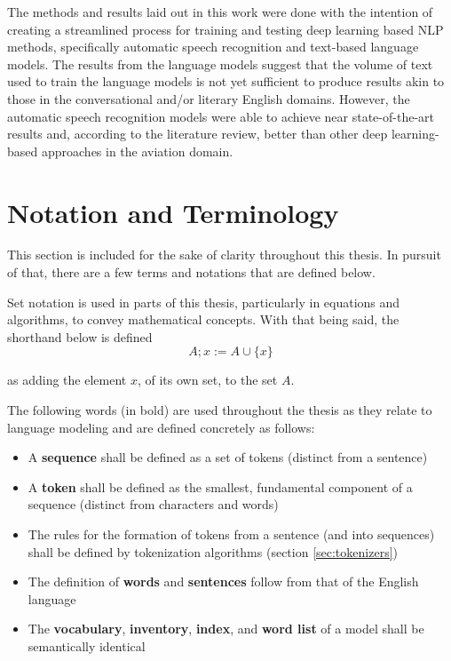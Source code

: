\documentclass[12pt]{article}
\begin{document}
The methods and results laid out in this work were done with the intention of creating a streamlined process for training and testing deep learning
based NLP methods, specifically automatic speech recognition and text-based language models. The results from the language models suggest that the
volume of text used to train the language models is not yet sufficient to produce results akin to those in the conversational and/or literary English
domains. However, the automatic speech recognition models were able to achieve near state-of-the-art results and, according to the literature review,
better than other deep learning-based approaches in the aviation domain.

\section{Notation and Terminology}
This section is included for the sake of clarity throughout this thesis. In pursuit of that, there are a few terms and notations that are defined
below.

Set notation is used in parts of this thesis, particularly in equations and algorithms, to convey mathematical concepts. With that being said, the
shorthand below is defined
\begin{equation*}
    A; x := A \cup \{x\}
\end{equation*}

\noindent
as adding the element $x$, of its own set, to the set $A$.

The following words (in bold) are used throughout the thesis as they relate to language modeling and are defined concretely as follows:
\begin{itemize}
    \item A \textbf{sequence} shall be defined as a set of tokens (distinct from a sentence)
    \item A \textbf{token} shall be defined as the smallest, fundamental component of a sequence (distinct from characters and words)
    \item The rules for the formation of tokens from a sentence (and into sequences) shall be defined by tokenization algorithms (section
          \ref{sec:tokenizers})
    \item The definition of \textbf{words} and \textbf{sentences} follow from that of the English language
    \item The \textbf{vocabulary}, \textbf{inventory}, \textbf{index}, and \textbf{word list} of a model shall be semantically identical
\end{itemize}
\end{document}
